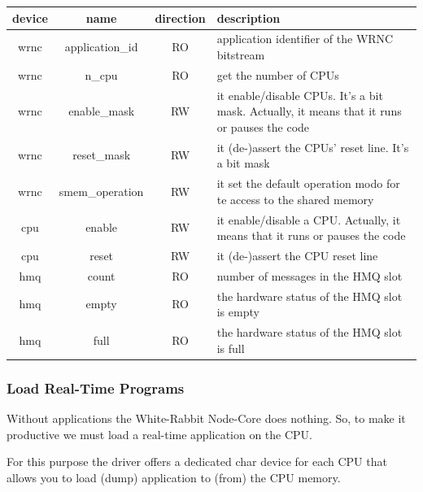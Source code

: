 \documentclass[a4paper,10pt]{article}
\begin{document}
\renewcommand{\arraystretch}{1.8}
\begin{tabular}{c c c p{6cm}}
  device & name & direction & description \\

\hline
  wrnc & application\_id & RO & application identifier of the WRNC 
bitstream \\

\hline
  wrnc & n\_cpu & RO & get the number of CPUs \\

\hline
  wrnc & enable\_mask & RW & it enable/disable CPUs. It's a bit mask. 
Actually, it means that it runs or pauses the code  \\

\hline
  wrnc & reset\_mask & RW & it (de-)assert the CPUs' reset line. It's 
a bit mask \\

\hline
  wrnc & smem\_operation & RW & it set the default operation modo for 
te access to the shared memory \\

\hline \hline

  cpu & enable & RW & it enable/disable a CPU. Actually, it means 
that it runs or pauses the code \\

\hline
  cpu & reset & RW & it (de-)assert the CPU reset line \\

\hline \hline

  hmq & count & RO & number of messages in the HMQ slot \\

\hline
  hmq & empty & RO & the hardware status of the HMQ slot is empty \\

\hline
  hmq & full & RO & the hardware status of the HMQ slot is full \\

\end{tabular}


\subsubsection{Load Real-Time Programs}%
Without applications the White-Rabbit Node-Core does nothing. So, to
make it productive we must load a real-time application on the CPU.

For this purpose the driver offers a dedicated char device for each
CPU that allows you to load (dump) application to (from) the CPU
memory.
\end{document}
